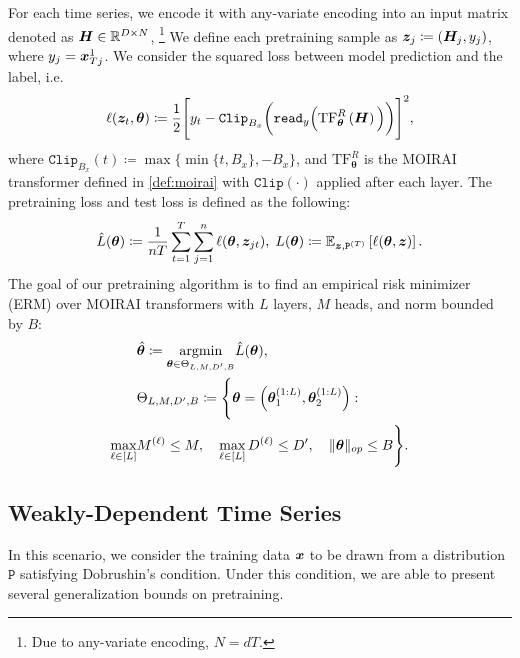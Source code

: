 For each time series, we encode it with any-variate encoding into an input matrix denoted as $\bm{H} \in \mathbb{R}^{D \times N}$, \footnote{Due to any-variate encoding, $N = dT$.}
We define each pretraining sample as $\bm{z}_j \coloneqq \left( \bm{H}_j, y_j \right)$, where $y_j = \bm{x}_{Tj}^1$.
We consider the squared loss between model prediction and the label, i.e.
{\small
\begin{equation*}
    \ell( \bm{z}_t, \bm{\theta} )
    \coloneqq
    \frac{1}{2}
    \Bigg[
    y_t
    -
    \mathtt{Clip}_{B_x}
    \bigg(
    \mathtt{read}_y
    \Big(
    \text{TF}_{\bm{\theta}}^R
    \left(
    \bm{H}
    \right)
    \Big)
    \bigg)
    \Bigg]^2,
\end{equation*}
}
where 
$\mathtt{Clip}_{B_x}(t) \coloneqq \max\{ \min \{ t, B_x \}, -B_x \}$, and $\text{TF}_{\bm{\theta}}^R$ is the MOIRAI transformer defined in \cref{def:moirai} with $\mathtt{Clip}(\cdot)$ applied after each layer.
The pretraining loss and test loss is defined as the following:
\begin{equation}\label{eqn:icl-loss}
    \hat{L}( \bm{\theta} )
    \coloneqq
    \frac{1}{nT}
    \sum_{t=1}^T
    \sum_{j=1}^n
    \ell( \bm{\theta}, \bm{z}_{jt} ),
    \;
    L( \bm{\theta} )
    \coloneqq
    \mathbb{E}_{\bm{z},\mathtt{P}^{(T)}}
    \left[
    \ell(  \bm{\theta}, \bm{z} )
    \right].
\end{equation}
The goal of our pretraining algorithm is to find an empirical risk minimizer (ERM) over MOIRAI transformers with $L$ layers, $M$ heads, and norm bounded by $B$:
\begin{align}\label{eqn:parameter-regime}
    &\hat{\bm{\theta}}
    \coloneqq
    \underset{ \bm{\theta} \in \Theta_{L,M,D^\prime, B} }{\mathop{\mathrm{argmin}}}
    \hat{L}
    (\bm{\theta}),
    \\
    &\Theta_{L,M,D^\prime,B}
    \coloneqq
    \Bigg\{
    \bm{\theta}
    =
    \left(
    \bm{\theta}_1^{(1:L)},
    \bm{\theta}_2^{(1:L)}
    \right)
    :
    \\
    \max_{\ell\in[L]}
    &M^{(\ell)} \leq M
    , 
    \quad
    \max_{\ell\in[L]}
    D^{(\ell)} \leq D^\prime
    ,
    \quad
    \Vert\boldsymbol{\theta}\Vert_{op}
    \leq 
    B
    \Bigg\}.
\end{align}
\subsection{Weakly-Dependent Time Series}
In this scenario, we consider the training data $\bm{x}$ to be drawn from a distribution $\mathtt{P}$ satisfying Dobrushin's condition.
Under this condition, we are able to present several generalization bounds on pretraining.


